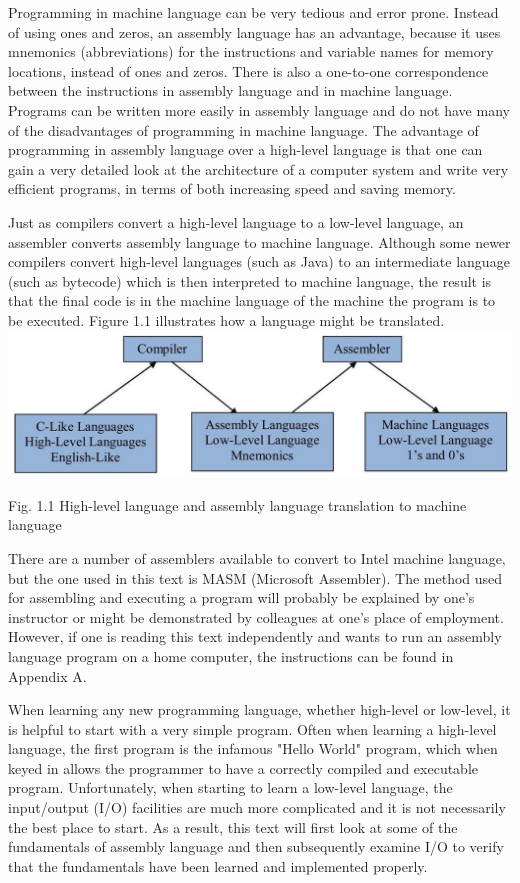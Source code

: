 \documentclass[10pt]{article}
\begin{document}
Programming in machine language can be very tedious and error prone. Instead of using ones and zeros, an assembly language has an advantage, because it uses mnemonics (abbreviations) for the instructions and variable names for memory locations, instead of ones and zeros. There is also a one-to-one correspondence between the instructions in assembly language and in machine language. Programs can be written more easily in assembly language and do not have many of the disadvantages of programming in machine language. The advantage of programming in assembly language over a high-level language is that one can gain a very detailed look at the architecture of a computer system and write very efficient programs, in terms of both increasing speed and saving memory.

Just as compilers convert a high-level language to a low-level language, an assembler converts assembly language to machine language. Although some newer compilers convert high-level languages (such as Java) to an intermediate language (such as bytecode) which is then interpreted to machine language, the result is that the final code is in the machine language of the machine the program is to be executed. Figure 1.1 illustrates how a language might be translated.\\
\includegraphics[max width=\textwidth, center]{2025_03_24_ebe50cc223a6fbc49eecg-018}

Fig. 1.1 High-level language and assembly language translation to machine language

There are a number of assemblers available to convert to Intel machine language, but the one used in this text is MASM (Microsoft Assembler). The method used for assembling and executing a program will probably be explained by one's instructor or might be demonstrated by colleagues at one's place of employment. However, if one is reading this text independently and wants to run an assembly language program on a home computer, the instructions can be found in Appendix A.

When learning any new programming language, whether high-level or low-level, it is helpful to start with a very simple program. Often when learning a high-level language, the first program is the infamous "Hello World" program, which when keyed in allows the programmer to have a correctly compiled and executable program. Unfortunately, when starting to learn a low-level language, the input/output (I/O) facilities are much more complicated and it is not necessarily the best place to start. As a result, this text will first look at some of the fundamentals of assembly language and then subsequently examine I/O to verify that the fundamentals have been learned and implemented properly.
\end{document}
